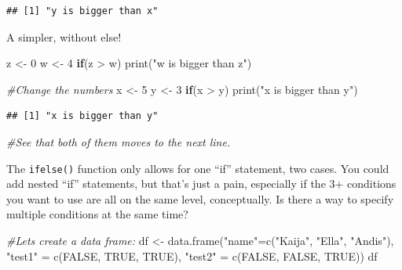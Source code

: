 \documentclass[
]{book}
\newenvironment{Shaded}{\begin{snugshade}}{\end{snugshade}}
\newcommand{\CommentTok}[1]{\textcolor[rgb]{0.56,0.35,0.01}{\textit{#1}}}
\newcommand{\ConstantTok}[1]{\textcolor[rgb]{0.00,0.00,0.00}{#1}}
\newcommand{\ControlFlowTok}[1]{\textcolor[rgb]{0.13,0.29,0.53}{\textbf{#1}}}
\newcommand{\DecValTok}[1]{\textcolor[rgb]{0.00,0.00,0.81}{#1}}
\newcommand{\FunctionTok}[1]{\textcolor[rgb]{0.00,0.00,0.00}{#1}}
\newcommand{\NormalTok}[1]{#1}
\newcommand{\OtherTok}[1]{\textcolor[rgb]{0.56,0.35,0.01}{#1}}
\newcommand{\SpecialCharTok}[1]{\textcolor[rgb]{0.00,0.00,0.00}{#1}}
\newcommand{\StringTok}[1]{\textcolor[rgb]{0.31,0.60,0.02}{#1}}
\begin{document}
\begin{verbatim}
## [1] "y is bigger than x"
\end{verbatim}

A simpler, without else!

\begin{Shaded}
\begin{Highlighting}[]
\NormalTok{z }\OtherTok{\textless{}{-}} \DecValTok{0}
\NormalTok{w }\OtherTok{\textless{}{-}} \DecValTok{4}
\ControlFlowTok{if}\NormalTok{(z }\SpecialCharTok{\textgreater{}}\NormalTok{ w) }\FunctionTok{print}\NormalTok{(}\StringTok{"w is bigger than z"}\NormalTok{)}

\CommentTok{\#Change the numbers}
\NormalTok{x }\OtherTok{\textless{}{-}} \DecValTok{5}
\NormalTok{y }\OtherTok{\textless{}{-}} \DecValTok{3}
\ControlFlowTok{if}\NormalTok{(x }\SpecialCharTok{\textgreater{}}\NormalTok{ y) }\FunctionTok{print}\NormalTok{(}\StringTok{"x is bigger than y"}\NormalTok{)}
\end{Highlighting}
\end{Shaded}

\begin{verbatim}
## [1] "x is bigger than y"
\end{verbatim}

\begin{Shaded}
\begin{Highlighting}[]
\CommentTok{\#See that both of them moves to the next line.}
\end{Highlighting}
\end{Shaded}

The \texttt{ifelse()} function only allows for one ``if'' statement, two cases. You could add nested ``if'' statements, but that's just a pain, especially if the 3+ conditions you want to use are all on the same level, conceptually. Is there a way to specify multiple conditions at the same time?

\begin{Shaded}
\begin{Highlighting}[]
\CommentTok{\#Let\textquotesingle{}s create a data frame:}
\NormalTok{df }\OtherTok{\textless{}{-}} \FunctionTok{data.frame}\NormalTok{(}\StringTok{"name"}\OtherTok{=}\FunctionTok{c}\NormalTok{(}\StringTok{"Kaija"}\NormalTok{, }\StringTok{"Ella"}\NormalTok{, }\StringTok{"Andis"}\NormalTok{), }\StringTok{"test1"} \OtherTok{=} \FunctionTok{c}\NormalTok{(}\ConstantTok{FALSE}\NormalTok{, }\ConstantTok{TRUE}\NormalTok{, }\ConstantTok{TRUE}\NormalTok{),}
                 \StringTok{"test2"} \OtherTok{=} \FunctionTok{c}\NormalTok{(}\ConstantTok{FALSE}\NormalTok{, }\ConstantTok{FALSE}\NormalTok{, }\ConstantTok{TRUE}\NormalTok{))}
\NormalTok{df}
\end{Highlighting}
\end{Shaded}
\end{document}
